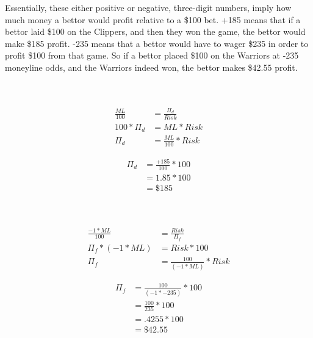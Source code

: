 \documentclass [MS] {uclathes}
\begin{document}
Essentially, these either positive or negative, three-digit numbers, imply how much money a bettor would profit relative to a \$100 bet. +185 means that if a bettor laid \$100 on the Clippers, and then they won the game, the bettor would make \$185 profit. -235 means that a bettor would have to wager \$235 in order to profit \$100 from that game. So if a bettor placed \$100 on the Warriors at -235 moneyline odds, and the Warriors indeed won, the bettor makes \$42.55 profit. 

\noindent {} \\
 \\
\begin{equation} \label{ml_prof_dog}
\begin{split}
\frac{ML}{100}  & = \frac{\Pi_{d}}{Risk}  \\
100*\Pi_{d} & = ML*Risk    \\
\Pi_{d} & = \frac{ML}{100} * Risk 
\end{split}
\end{equation}

\noindent {}
\begin{equation*} 
\begin{split}
\Pi_{d} & = \frac{+185}{100} * 100 \\
 & = 1.85 * 100 \\
 & = \$185
\end{split}
\end{equation*}


\noindent {} \\
 \\
\begin{equation} \label{ml_prof_fav}
\begin{split}
\frac{-1 * ML}{100}  & = \frac{Risk}{\Pi_{f}}  \\
\Pi_{f} * (-1 * ML) & = Risk * 100  \\
\Pi_{f} & = \frac{100}{(-1 * ML)} * Risk 
\end{split}
\end{equation}

\noindent {}
\begin{equation*} 
\begin{split}
\Pi_{f} & =  \frac{100}{(-1 * -235)} * 100 \\
 & = \frac{100}{235} * 100 \\
 & = .4255 * 100 \\
 & = \$42.55
\end{split}
\end{equation*}
\end{document}
